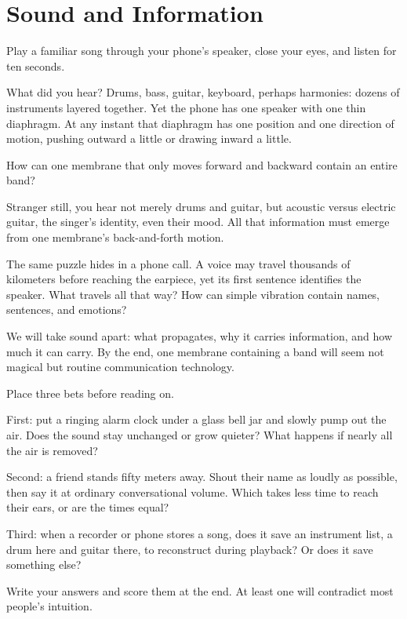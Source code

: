 \chapter{Sound and Information}


\begin{mainline}
Play a familiar song through your phone's speaker, close your eyes, and listen for ten seconds.

What did you hear? Drums, bass, guitar, keyboard, perhaps harmonies: dozens of instruments layered together. Yet the phone has one speaker with one thin diaphragm. At any instant that diaphragm has one position and one direction of motion, pushing outward a little or drawing inward a little.

How can one membrane that only moves forward and backward contain an entire band?

Stranger still, you hear not merely drums and guitar, but acoustic versus electric guitar, the singer's identity, even their mood. All that information must emerge from one membrane's back-and-forth motion.

The same puzzle hides in a phone call. A voice may travel thousands of kilometers before reaching the earpiece, yet its first sentence identifies the speaker. What travels all that way? How can simple vibration contain names, sentences, and emotions?

We will take sound apart: what propagates, why it carries information, and how much it can carry. By the end, one membrane containing a band will seem not magical but routine communication technology.
\end{mainline}


\begin{mainline}
Place three bets before reading on.

First: put a ringing alarm clock under a glass bell jar and slowly pump out the air. Does the sound stay unchanged or grow quieter? What happens if nearly all the air is removed?

Second: a friend stands fifty meters away. Shout their name as loudly as possible, then say it at ordinary conversational volume. Which takes less time to reach their ears, or are the times equal?

Third: when a recorder or phone stores a song, does it save an instrument list, a drum here and guitar there, to reconstruct during playback? Or does it save something else?

Write your answers and score them at the end. At least one will contradict most people's intuition.
\end{mainline}


